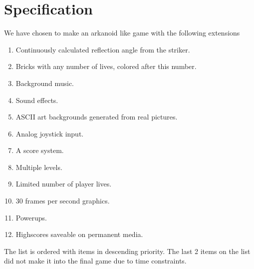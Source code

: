 \section{Specification}
We have chosen to make an arkanoid like game with the following extensions

\begin{enumerate}
\item Continuously calculated reflection angle from the striker.
\item Bricks with any number of lives, colored after this number.
\item Background music.
\item Sound effects.
\item ASCII art backgrounds generated from real pictures.
\item Analog joystick input.
\item A score system.
\item Multiple levels.
\item Limited number of player lives.
\item 30 frames per second graphics.
\item Powerups.
\item Highscores saveable on permanent media.
\end{enumerate}

The list is ordered with items in descending priority. The last 2 items on the list
did not make it into the final game due to time constraints.
